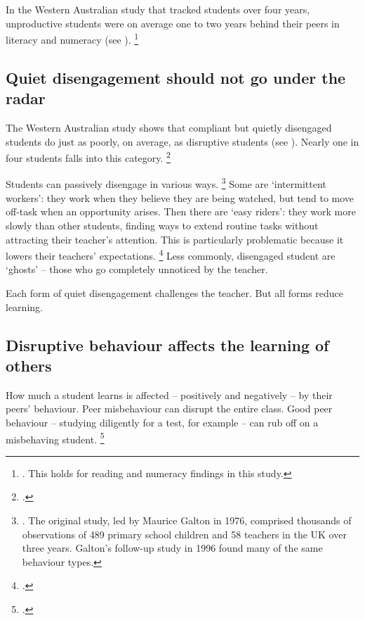 \documentclass{grattan}
\begin{document}
In the Western Australian study that tracked students over four years, unproductive students were on average one to two years behind their peers in literacy and numeracy (see
).%
    \footnote{\textcite{Angus2009PipelineProject}. This holds for reading and numeracy findings in this study.}


\subsection{Quiet disengagement should not go under the radar}\label{subsec:quiet-disengagement-under-radar}
The Western Australian study shows that compliant but quietly disengaged students do just as poorly, on average, as disruptive students (see ). Nearly one in four students falls into this category.%
    \footcite{Angus2009PipelineProject}

Students can passively disengage in various ways.%
    \footnote{\textcite{Galton1999ChangesPatternsTeacher}.
    The original study, led by Maurice Galton in 1976, comprised thousands of observations of 489 primary school children and 58 teachers in the UK over three years.
    Galton's follow-up study in 1996 found many of the same behaviour types.}
Some are `intermittent workers': they work when they believe they are being watched, but tend to move off-task when an opportunity arises. Then there are `easy riders': they work more slowly than other students, finding ways to extend routine tasks without attracting their teacher's attention. This is particularly problematic because it lowers their teachers' expectations.%
    \footcites{Angus2009PipelineProject}{Galton1999ChangesPatternsTeacher}
Less commonly, disengaged student are `ghosts' -- those who go completely unnoticed by the teacher.

Each form of quiet disengagement challenges the teacher. But all forms reduce learning.

\subsection{Disruptive behaviour affects the learning of others}\label{subsec:disruptive-behaviour-affects-learning-others}
How much a student learns is affected -- positively and negatively -- by their peers' behaviour.
Peer misbehaviour can disrupt the entire class. Good peer behaviour -- studying diligently for a test, for example -- can rub off on a misbehaving student.%
\footcites{Carrell2016LongRunEffectsDisruptive}{McVicar2013RightPeerRight}
\end{document}
